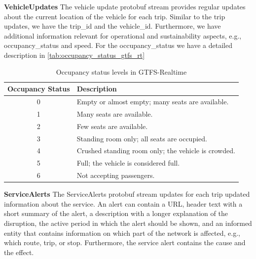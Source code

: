 \par\medskip
\noindent\textbf{VehicleUpdates} \quad
The vehicle update protobuf stream provides regular updates about the current location of the vehicle for each trip. Similar to the trip updates, we have the trip\_id and the vehicle\_id. Furthermore, we have additional information relevant for operational and sustainability aspects, e.g., occupancy\_status and speed. For the occupancy\_status we have a detailed description in \autoref{tab:occupancy_status_gtfs_rt}
\begin{table}[H]
    \centering
    \caption{Occupancy status levels in GTFS-Realtime}
    \begin{tabular}{c p{}}
        \hline
        \textbf{Occupancy Status} & \textbf{Description} \\
        \hline
        0 & Empty or almost empty; many seats are available. \\
        1 & Many seats are available. \\
        2 & Few seats are available. \\
        3 & Standing room only; all seats are occupied. \\
        4 & Crushed standing room only; the vehicle is crowded. \\
        5 & Full; the vehicle is considered full. \\
        6 & Not accepting passengers. \\
        \hline
    \end{tabular}
    
    \label{tab:occupancy_status_gtfs_rt}
\end{table}


\par\medskip
\noindent\textbf{ServiceAlerts} \quad
The ServiceAlerts protobuf stream updates for each trip updated information about the service. An alert can contain a URL, header text with a short summary of the alert, a description with a longer explanation of the disruption, the active period in which the alert should be shown, and an informed entity that contains information on which part of the network is affected, e.g., which route, trip, or stop. Furthermore, the service alert contains the cause and the effect.





